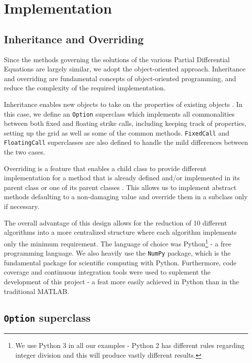 \documentclass[12pt]{report}
\begin{document}
\chapter{Implementation}

\section{Inheritance and Overriding}
Since the methods governing the solutions of the various Partial Differential Equations are largely similar, we adopt the object-oriented approach. Inheritance and overriding are fundamental concepts of object-oriented programming, and reduce the complexity of the required implementation.

Inheritance enables new objects to take on the properties of existing objects \cite{oop_inheritance}. In this case, we define an \texttt{Option} superclass which implements all commonalities between both fixed and floating strike calls, including keeping track of properties, setting up the grid as well as some of the common methods. \texttt{FixedCall} and \texttt{FloatingCall} superclasses are also defined to handle the mild differences between the two cases.

Overriding is a feature that enables a child class to provide different implementation for a method that is already defined and/or implemented in its parent class or one of its parent classes \cite{oop_override}. This allows us to implement abstract methods defaulting to a non-damaging value and override them in a subclass only if necessary.

The overall advantage of this design allows for the reduction of 10 different algorithms into a more centralized structure where each algorithm implements only the minimum requirement. The language of choice was Python\footnote{We use Python 3 in all our examples - Python 2 has different rules regarding integer division and this will produce vastly different results.} - a free programming language. We also heavily use the \texttt{NumPy} package, which is the fundamental package for scientific computing with Python. Furthermore, code coverage and continuous integration tools were used to suplement the development of this project - a feat more easily achieved in Python than in the traditional MATLAB.

\normalsize

\section{\texttt{Option} superclass}
\end{document}

